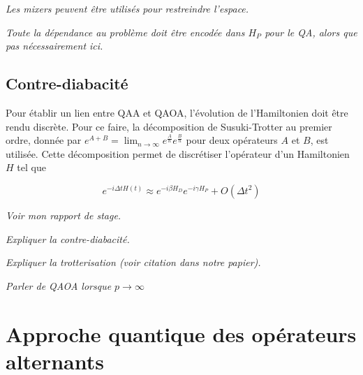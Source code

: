 \textcolor{mydarkred}{\textit{Les mixers peuvent être utilisés pour restreindre l'espace.}}


\textcolor{mydarkred}{\textit{Toute la dépendance au problème doit être encodée dans $H_P$ pour le QA, alors que pas nécessairement ici.}}


\subsection{Contre-diabacité}

Pour établir un lien entre QAA et QAOA, l'évolution de l'Hamiltonien doit être rendu discrète. Pour ce faire, la décomposition de Susuki-Trotter au premier ordre, donnée par $e^{A+B} = \lim_{n \to \infty} e^{\frac{A}{n}} e^{\frac{B}{n}}$ pour deux opérateurs $A$ et $B$, est utilisée. Cette décomposition permet de discrétiser l'opérateur d'un Hamiltonien $H$ tel que

\begin{equation}
    e^{-i\Delta t H(t)} \approx e^{-i \beta H_D} e^{-i \gamma H_P} + O(\Delta t^2)
\end{equation}

\textcolor{mydarkred}{\textit{Voir mon rapport de stage.}}

\textcolor{mydarkred}{\textit{Expliquer la contre-diabacité.}}

\textcolor{mydarkred}{\textit{Expliquer la trotterisation (voir citation dans notre papier).}}

\textcolor{mydarkred}{\textit{Parler de QAOA lorsque $p \to \infty$}}



\section{Approche quantique des opérateurs alternants}

